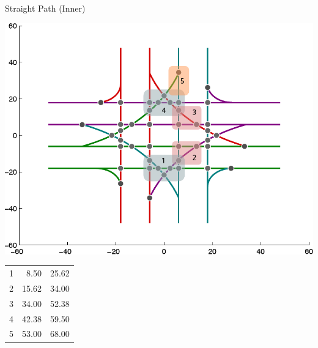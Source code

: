 
\begin{frame}{Straight Path (Inner)}
\begin{minipage}{0.65\linewidth}
\centering\includegraphics[width=\linewidth]{diagram/intxn_partition_str1.pdf}
\end{minipage}
\hfill
\begin{minipage}{0.3\linewidth}
\footnotesize
	\begin{tabular}{| c | r r |}
	\hline
	1 & 8.50 & 25.62 \\
	2 & 15.62 & 34.00 \\
	3 & 34.00 & 52.38 \\
	4 & 42.38 & 59.50 \\
	5 & 53.00 & 68.00 \\
	\hline
	\end{tabular}
\end{minipage}
\end{frame}


